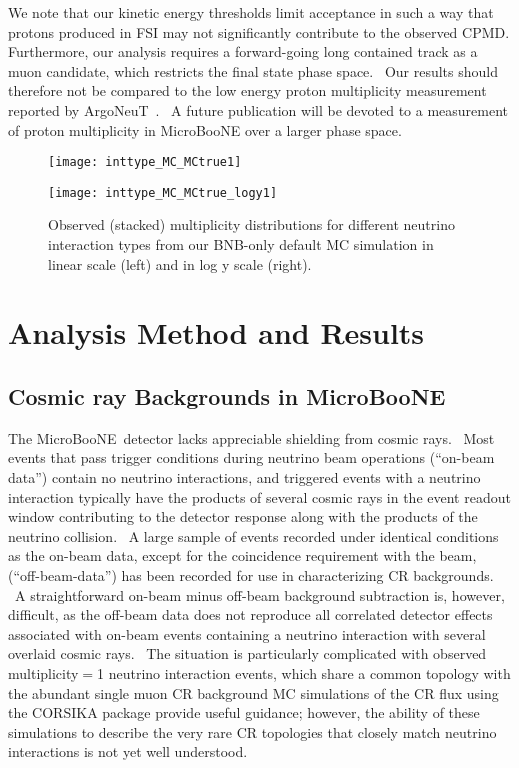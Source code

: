 \documentclass{article}
\begin{document}
We note that our kinetic energy thresholds limit acceptance in such a way that protons produced in FSI may not significantly contribute to the observed CPMD. Furthermore, our analysis requires a forward-going long contained track as a muon candidate, which restricts the final state phase space. \ Our results should therefore not be compared to the low
energy proton multiplicity measurement reported by ArgoNeuT~\cite{ArgoNeuT
protons}. \ A future publication will be devoted to a measurement of proton
multiplicity in MicroBooNE over a larger phase space.

\begin{figure}[h]
\begin{minipage}{.5\textwidth}
\centering
\texttt{[image: inttype\_MC\_MCtrue1]}
\end{minipage}
\begin{minipage}{.5\textwidth}
\centering
\texttt{[image: inttype\_MC\_MCtrue\_logy1]}
\end{minipage}
\caption{Observed (stacked) multiplicity distributions for different
neutrino interaction types from our BNB-only default MC simulation in linear scale (left) and in log y scale (right).}
\label{img:inttype_MC_MCtrue}
\end{figure}


\section{Analysis Method and Results}

\label{sig_extraction}

\subsection{Cosmic ray Backgrounds in MicroBooNE}

The MicroBooNE\ detector lacks appreciable shielding from cosmic rays. \
Most events that pass trigger conditions during neutrino beam operations
(\textquotedblleft on-beam data\textquotedblright ) contain no neutrino
interactions, and triggered events with a neutrino interaction typically
have the products of several cosmic rays in the event readout window
contributing to the detector response along with the products of the neutrino
collision. \ A large sample of events recorded under identical conditions as
the on-beam data, except for the coincidence requirement with the beam,
(\textquotedblleft off-beam-data\textquotedblright ) has been recorded for
use in characterizing CR backgrounds. \ A straightforward on-beam minus
off-beam background subtraction is, however, difficult, as the off-beam data
does not reproduce all correlated detector effects associated with on-beam
events containing a neutrino interaction with several overlaid cosmic rays.
\ The situation is particularly complicated with observed multiplicity$=$1
neutrino interaction events, which share a common topology with the abundant single muon CR background MC simulations of the CR flux using the CORSIKA package provide useful guidance; however, the ability of
these simulations to describe the very rare CR topologies that closely match
neutrino interactions is not yet well understood.
\end{document}
